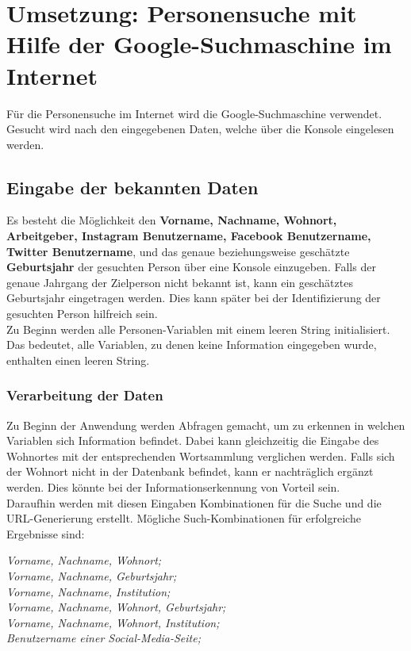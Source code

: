 \section{Umsetzung: Personensuche mit Hilfe der Google-Suchmaschine im Internet}
Für die Personensuche im Internet wird die Google-Suchmaschine verwendet. Gesucht wird nach den eingegebenen Daten, welche über die Konsole eingelesen werden.

	\subsection{Eingabe der bekannten Daten}
	Es besteht die Möglichkeit den \textbf{Vorname, Nachname, Wohnort, Arbeitgeber, Instagram Benutzername, Facebook Benutzername, Twitter Benutzername}, und das genaue beziehungsweise geschätzte \textbf{Geburtsjahr} der gesuchten Person über eine Konsole einzugeben. Falls der genaue Jahrgang der Zielperson nicht bekannt ist, kann ein geschätztes Geburtsjahr eingetragen werden. Dies kann später bei der Identifizierung der gesuchten Person hilfreich sein.\\
	Zu Beginn werden alle Personen-Variablen mit einem leeren String initialisiert. Das bedeutet, alle Variablen, zu denen keine Information eingegeben wurde, enthalten einen leeren String.
	
		\subsubsection{Verarbeitung der Daten}
		Zu Beginn der Anwendung werden Abfragen gemacht, um zu erkennen in welchen Variablen sich Information befindet. Dabei kann gleichzeitig die Eingabe des Wohnortes mit der entsprechenden Wortsammlung verglichen werden. Falls sich der Wohnort nicht in der Datenbank befindet, kann er nachträglich ergänzt werden. Dies könnte bei der Informationserkennung von Vorteil sein.\\
		Daraufhin werden mit diesen Eingaben Kombinationen für die Suche und die URL-Generierung erstellt. Mögliche Such-Kombinationen für erfolgreiche Ergebnisse sind:
		
		\textit{Vorname, Nachname, Wohnort;}\\
		\textit{Vorname, Nachname, Geburtsjahr;}\\
		\textit{Vorname, Nachname, Institution;}\\
		\textit{Vorname, Nachname, Wohnort, Geburtsjahr;}\\
		\textit{Vorname, Nachname, Wohnort, Institution;}\\
		\textit{Benutzername einer Social-Media-Seite;}
		
